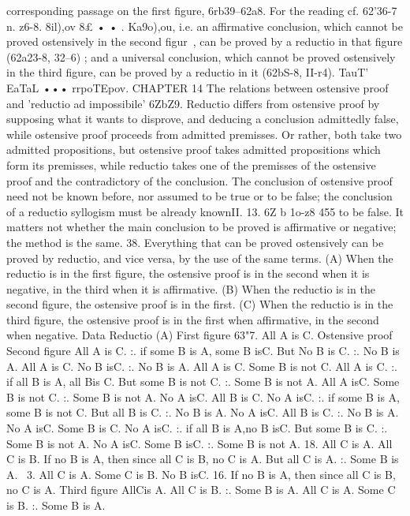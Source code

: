 corresponding passage on the first figure, 6rb39--62a8. For the
reading cf. 62'36-7 n.
z6-8. 8il),ov 8£ • • . Ka9o),ou, i.e. an affirmative conclusion,
which cannot be proved ostensively in the second figur~, can be
proved by a reductio in that figure (62a23-8, 32--6) ; and a universal
conclusion, which cannot be proved ostensively in the third figure,
can be proved by a reductio in it (62bS-8, II-r4).
TauT' EaTaL ••• rrpoTEpov.
CHAPTER 14
The relations between ostensive proof and 'reductio ad impossibile'
6ZbZ9. Reductio differs from ostensive proof by supposing what
it wants to disprove, and deducing a conclusion admittedly false,
while ostensive proof proceeds from admitted premisses. Or
rather, both take two admitted propositions, but ostensive proof
takes admitted propositions which form its premisses, while
reductio takes one of the premisses of the ostensive proof and the
contradictory of the conclusion. The conclusion of ostensive
proof need not be known before, nor assumed to be true or to be
false; the conclusion of a reductio syllogism must be already knownII. 13. 6Z b 1o-z8
455
to be false. It matters not whether the main conclusion to be
proved is affirmative or negative; the method is the same.
38. Everything that can be proved ostensively can be proved
by reductio, and vice versa, by the use of the same terms. (A)
When the reductio is in the first figure, the ostensive proof is in
the second when it is negative, in the third when it is affirmative.
(B) When the reductio is in the second figure, the ostensive proof
is in the first. (C) When the reductio is in the third figure, the
ostensive proof is in the first when affirmative, in the second when
negative.
Data
Reductio
(A) First figure
63"7. All A is C.
Ostensive proof
Second figure
All A is C.
:. if some B is A, some
B isC.
But No B is C.
:. No B is A. All A is C.
No B isC.
:. No B is A.
All A is C.
Some B is not C. All A is C.
:. if all B is A, all Bis C.
But some B is not C.
:. Some B is not A. All A isC.
Some B is not C.
:. Some B is not A.
No A isC.
All B is C. No A isC.
:. if some B is A, some
B is not C.
But all B is C.
:. No B is A. No A isC.
All B is C.
:. No B is A.
No A isC.
Some B is C. No A isC.
:. if all B is A,no B isC.
But some B is C.
:. Some B is not A. No A isC.
Some B isC.
:. Some B is not A.
18. All C is A.
All C is B. If no B is A, then since
all C is B, no C is A.
But all C is A.
:. Some B is A. ~3. All C is A.
Some C is B.
No B isC.
16.
If no B is A, then since
all C is B, no C is A.
Third figure
AllCis A.
All C is B.
:. Some B is A.
All C is A.
Some C is B.
:. Some B is A.
